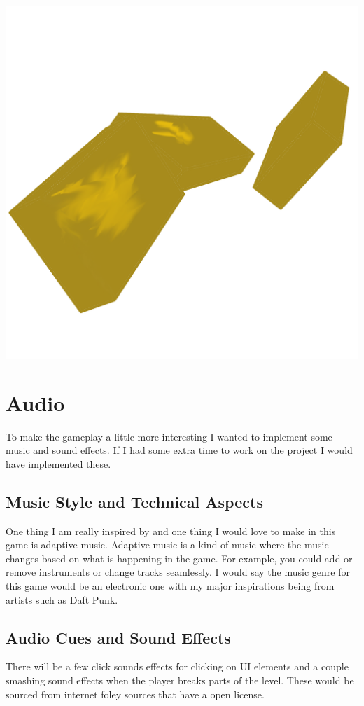 \documentclass[12pt]{article}
\begin{document}
	\includegraphics[scale=0.1]{platforms.png}
	
	\section{Audio}
	To make the gameplay a little more interesting I wanted to implement some music and sound effects. If I had some extra time to work on the project I would have implemented these.
	\subsection{Music Style and Technical Aspects}
 	One thing I am really inspired by and one thing I would love to make in this game is adaptive music. Adaptive music is a kind of music where the music changes based on what is happening in the game. For example, you could add or remove instruments or change tracks seamlessly. I would say the music genre for this game would be an electronic one with my major inspirations being from artists such as Daft Punk.
	\subsection{Audio Cues and Sound Effects}
	There will be a few click sounds effects for clicking on UI elements and a couple smashing sound effects when the player breaks parts of the level. These would be sourced from internet foley sources that have a open license. 
\end{document}
